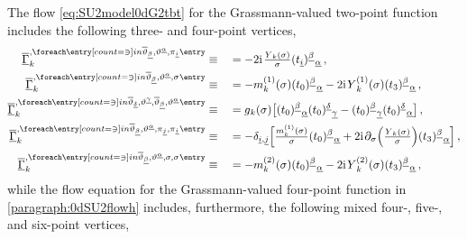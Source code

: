 The flow \cref{eq:SU2model0dG2tbt} for the Grassmann-valued two-point function includes the following three- and four-point vertices,
\begin{alignat}{2}
\FSvertexArg{\FSeaaEoM}{\overline{\vartheta} {}_{\underline{\beta}},{\vartheta} \text{}^{\underline{\alpha}},{\pi} {}_{\underline{i}}}&\equiv&&=-2 \iu\vts  \tfrac{\FScoupling{Y}{0}{\sigma}}{\sigma } \suIItij{\underline{i}}{\underline{\beta}}{\underline{\alpha}}\, , \\ 
\FSvertexArg{\FSeaaEoM}{\overline{\vartheta} {}_{\underline{\beta}},{\vartheta} \text{}^{\underline{\alpha}},\sigma}&\equiv&&=-\FScoupling{m}{1}{\sigma} \suIItij{0}{\underline{\beta}}{\underline{\alpha}}-2 \iu\vts \FScoupling{Y}{1}{\sigma} \suIItij{3}{\underline{\beta}}{\underline{\alpha}}\, , \\ 
\FSvertexArg{\FSeaaEoM}{\overline{\vartheta} {}_{\underline{\delta}},{\vartheta} \text{}^{\underline{\gamma}},\overline{\vartheta} {}_{\underline{\beta}},{\vartheta} \text{}^{\underline{\alpha}}}&\equiv&&=\FScoupling{g}{0}{\sigma} \big[\suIItij{0}{\underline{\beta}}{\underline{\alpha}} \suIItij{0}{\underline{\delta}}{\underline{\gamma}}-\suIItij{0}{\underline{\beta}}{\underline{\gamma}} \suIItij{0}{\underline{\delta}}{\underline{\alpha}}\big]\, , \\ 
\FSvertexArg{\FSeaaEoM}{\overline{\vartheta} {}_{\underline{\beta}},{\vartheta} \text{}^{\underline{\alpha}},{\pi} {}_{\underline{j}},{\pi} {}_{\underline{i}}}&\equiv&&=-\delta_{\underline{i},\underline{j}} \Big[\tfrac{\FScoupling{m}{1}{\sigma}}{\sigma }\suIItij{0}{\underline{\beta}}{\underline{\alpha}}+2 \iu \vts\partial_{\sigma}\Big(\tfrac{\FScoupling{Y}{0}{\sigma}}{\sigma }\Big) \suIItij{3}{\underline{\beta}}{\underline{\alpha}}\Big]\, , \\ 
\FSvertexArg{\FSeaaEoM}{\overline{\vartheta} {}_{\underline{\beta}},{\vartheta} \text{}^{\underline{\alpha}},\sigma,\sigma}&\equiv&&=-\FScoupling{m}{2}{\sigma}\suIItij{0}{\underline{\beta}}{\underline{\alpha}}-2 \iu \vts\FScoupling{Y}{2}{\sigma} \suIItij{3}{\underline{\beta}}{\underline{\alpha}}\, ,
\end{alignat}
while the flow equation for the Grassmann-valued four-point function in \cref{paragraph:0dSU2flowh} includes, furthermore, the following mixed four-, five-, and six-point vertices,
